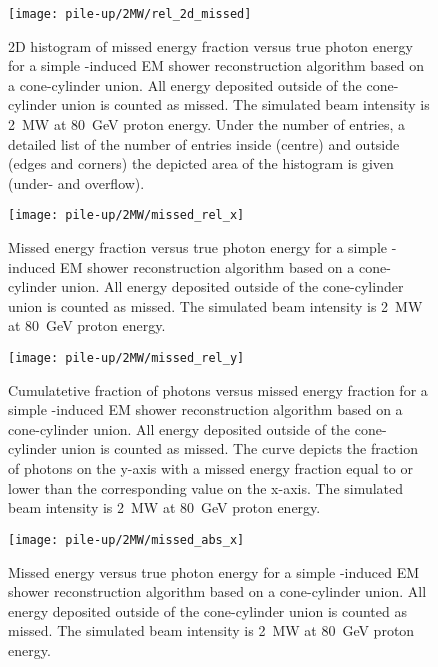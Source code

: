 \begin{figure}[htb]
	\centering
	\texttt{[image: pile-up/2MW/rel\_2d\_missed]}
	\caption{2D histogram of missed energy fraction versus true photon energy for a simple \Pgpz-induced EM shower reconstruction algorithm based on a cone-cylinder union.
		All energy deposited outside of the cone-cylinder union is counted as missed.
		The simulated beam intensity is \SI{2}{\mega\watt} at \SI{80}{\giga\electronvolt} proton energy.
		Under the number of entries, a detailed list of the number of entries inside (centre) and outside (edges and corners) the depicted area of the histogram is given (under- and overflow).}
	\label{fig:dune-nd_2MW_rel-2d-missed}
\end{figure}

\begin{figure}[htb]
	\centering
	\texttt{[image: pile-up/2MW/missed\_rel\_x]}
	\caption{Missed energy fraction versus true photon energy for a simple \Pgpz-induced EM shower reconstruction algorithm based on a cone-cylinder union.
		All energy deposited outside of the cone-cylinder union is counted as missed.
		The simulated beam intensity is \SI{2}{\mega\watt} at \SI{80}{\giga\electronvolt} proton energy.}
	\label{fig:dune-nd_2MW_missed-rel-x}
\end{figure}

\begin{figure}[htb]
	\centering
	\texttt{[image: pile-up/2MW/missed\_rel\_y]}
	\caption{Cumulatetive fraction of photons versus missed energy fraction for a simple \Pgpz-induced EM shower reconstruction algorithm based on a cone-cylinder union.
		All energy deposited outside of the cone-cylinder union is counted as missed.
		The curve depicts the fraction of photons on the y-axis with a missed energy fraction equal to or lower than the corresponding value on the x-axis.
		The simulated beam intensity is \SI{2}{\mega\watt} at \SI{80}{\giga\electronvolt} proton energy.}
	\label{fig:dune-nd_2MW_missed-rel-y}
\end{figure}

\begin{figure}[htb]
	\centering
	\texttt{[image: pile-up/2MW/missed\_abs\_x]}
	\caption{Missed energy versus true photon energy for a simple \Pgpz-induced EM shower reconstruction algorithm based on a cone-cylinder union.
		All energy deposited outside of the cone-cylinder union is counted as missed.
		The simulated beam intensity is \SI{2}{\mega\watt} at \SI{80}{\giga\electronvolt} proton energy.}
	\label{fig:dune-nd_2MW_missed-abs-x}
\end{figure}

